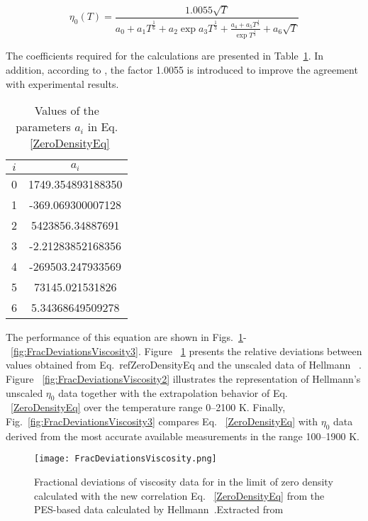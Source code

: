 \begin{equation}
    \eta_0(T) = \frac{1.0055\sqrt{T}}{a_0 + a_1T^{\frac{1}{6}}+ a_2\exp{a_3T^{\frac{1}{3}}} + \frac{a_4 + a_5T^{\frac{1}{3}}}{\exp{T^{\frac{1}{3}}}} + a_6\sqrt{T}}
	\label{ZeroDensityEq}
\end{equation}

The coefficients required for the calculations are presented in
Table~\ref{ZeroDensityCoef}. In addition, according to
\cite{laesecke2017reference}, the factor 1.0055 is introduced to improve the
agreement with experimental results.

\begin{table}[h]
    \centering
    \begin{tabular}{c|c}
        $i$ & $a_i$\\
        \hline  
        0 & 1749.354893188350\\
        1 & -369.069300007128\\
        2 & 5423856.34887691\\
        3 & -2.21283852168356\\
        4 & -269503.247933569\\
        5 & 73145.021531826\\
        6 & 5.34368649509278\\
    \end{tabular}
    \caption{Values of the parameters $a_i$ in Eq. ~\ref{ZeroDensityEq}}
    \label{ZeroDensityCoef}
\end{table}

The performance of this equation are shown in
Figs.~\ref{fig:FracDeviationsViscosity}-~\ref{fig:FracDeviationsViscosity3}.
Figure ~\ref{fig:FracDeviationsViscosity} presents the relative deviations
between values obtained from Eq.~ref{ZeroDensityEq} and the unscaled data of
Hellmann ~\cite{hellmann2014ab}. Figure ~\ref{fig:FracDeviationsViscosity2}
illustrates the representation of Hellmann’s unscaled $\eta_0$ data together
with the extrapolation behavior of Eq. ~\ref{ZeroDensityEq} over the temperature
range 0–2100 K. Finally, Fig.~\ref{fig:FracDeviationsViscosity3} compares Eq.
~\ref{ZeroDensityEq} with $\eta_0$ data derived from the most accurate available
measurements in the range 100–1900 K.

\begin{figure}[h!]
	\centering
	\texttt{[image: FracDeviationsViscosity.png]}
	\caption{Fractional deviations of viscosity data for  in the limit
	of zero density calculated with the new correlation Eq. ~\ref{ZeroDensityEq}
	from the PES-based data calculated by
	Hellmann~\cite{hellmann2014ab}.Extracted from ~\cite{laesecke2017reference}}
\label{fig:FracDeviationsViscosity}
\end{figure}

